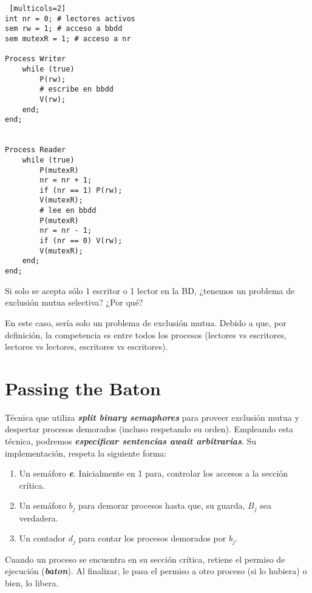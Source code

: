 \documentclass[a4paper, 10pt]{report}
\begin{document}
\begin{lstlisting} [multicols=2]
int nr = 0; # lectores activos
sem rw = 1; # acceso a bbdd
sem mutexR = 1; # acceso a nr

Process Writer
    while (true)
        P(rw);
        # escribe en bbdd
        V(rw);
    end;
end;


Process Reader
    while (true)
        P(mutexR)
        nr = nr + 1;
        if (nr == 1) P(rw);
        V(mutexR);
        # lee en bbdd
        P(mutexR)
        nr = nr - 1;
        if (nr == 0) V(rw);
        V(mutexR);
    end;
end;
\end{lstlisting}

\begin{basic_box}
     Si solo se acepta sólo 1 escritor  o 1 lector en la BD, ¿tenemos un problema de exclusión mutua selectiva? ¿Por qué?

    En este caso, sería solo un problema de exclusión mutua. Debido a que, por definición, la competencia es entre todos los procesos (lectores vs escritores, lectores vs lectores, escritores vs escritores).
\end{basic_box}

\section{Passing the Baton}

Técnica que utiliza \textbf{\emph{split binary semaphores}} para proveer exclusión mutua y despertar procesos demorados (incluso respetando su orden). Empleando esta técnica, podremos \textbf{\emph{especificar sentencias await arbitrarias}}. Su implementación, respeta la siguiente forma:

\begin{enumerate}
    \item Un semáforo \textbf{\emph{e}}. Inicialmente en 1 para, controlar los accesos a la sección crítica.
    \item Un semáforo \textbf{\emph{$b_j$}} para demorar procesos hasta que, su guarda, \textbf{\emph{$B_j$}} sea verdadera.
    \item Un contador \textbf{\emph{$d_j$}} para contar los procesos demorados por \textbf{\emph{$b_j$}}.
\end{enumerate}

Cuando un proceso se encuentra en su sección crítica, retiene el permiso de ejecución (\textbf{\emph{baton}}). Al finalizar, le pasa el permiso a otro proceso (si lo hubiera) o bien, lo libera.
\end{document}
